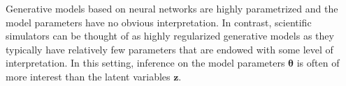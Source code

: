 \documentclass[twocolumn,superscriptaddress,aps]{revtex4-1}
\newcommand{\bftheta}{{\bm \theta}}
\newcommand{\bfx}{\mathbf{x}}
\newcommand{\bfz}{\mathbf{z}}
\theoremstyle{plain}
\begin{document}

%



%
%

Generative models based on neural networks are highly parametrized and the model parameters have no obvious interpretation. In contrast, scientific simulators can be thought of as highly regularized generative models as they typically have relatively few parameters that are endowed with some level of interpretation. In this setting, inference on the model parameters $\bftheta$ is often of more interest than the latent variables $\bfz$.
\end{document}
